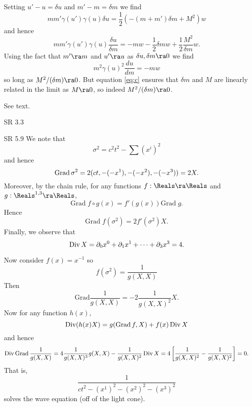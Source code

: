 \documentclass[minion]{homework}
\DeclareMathOperator{\Grad}{\rm Grad}
\DeclareMathOperator{\Div}{\rm Div}
\begin{document}
\begin{aproblems}
\subsol
Setting $u'-u=\delta u$ and $m'-m=\delta m$ we find
\begin{equation}
mm'\gamma(u')\gamma(u) \delta u = \frac{1}{2}( -(m+m')\delta m +M^2)w
\end{equation}
and hence
\begin{equation}
mm'\gamma(u')\gamma(u) \frac{\delta u}{\delta m} = -mw-\frac{1}{2}\delta mw + \frac{1}{2}\frac{M^2}{\delta m}w.
\end{equation}
Using the fact that $m'\ra m$ and $u'\ra u$ as $\delta u,\delta m\ra 0$ we find
\begin{equation}
m^2\gamma(u)^2 \frac{d u}{d m} =- mw
\end{equation}
so long as $M^2/(\delta m)\ra 0$.  But equation \eqref{eq:c} ensures that $\delta m$
and $M$ are linearly related in the limit as $M\ra 0$, so indeed $M^2/(\delta m)\ra 0$.

\subsol
See text.


\hproblem SR 3.3

\hproblem SR 5.9
We note that
\[
\sigma^2 = c^2t^2 - \sum (x^i)^2
\]
and hence
\[
\Grad \sigma^2 = 2(ct,-(-x^1),-(-x^2),-(-x^3)) = 2X.
\]
Moreover, by the chain rule, for any functions $f:\Reals\ra\Reals$ and 
$g:\Reals^{1,3}\ra\Reals$,
\[
\mathrm{Grad}\; f\circ g(x) = f'(g(x))\mathrm{Grad}\; g.
\]
Hence
\[
\mathrm{Grad}\; f(\sigma^2) = 2f'(\sigma^2) X.
\]
Finally, we observe that
\[
\Div X = \partial_0 x^0 + \partial_1 x^1 + \cdots + \partial_3 x^3 = 4.
\]

Now consider $f(x)=x^{-1}$ so 
\[
f(\sigma^2) = \frac{1}{g(X,X)}
\]
Then 
\[
\mathrm{Grad} \frac{1}{g(X,X)} = -2\frac{1}{g(X,X)^2}X.
\]
Now for any function $h(x)$,
\[
\Div (h(x) X) = g(\Grad f,X) + f(x) \Div X
\]
and hence
\[
\Div \Grad \frac{1}{g(X,X)} = 4\frac{1}{g(X,X)^3}g(X,X) - \frac{1}{g(X,X)^2} \Div X =  4\left[\frac{1}{g(X,X)^2}-\frac{1}{g(X,X)^2}\right]=0.
\]
That is,
\[
\frac{1}{ct^2-(x^1)^2-(x^2)^2-(x^3)^2}
\]
solves the wave equation (off of the light cone).



\end{aproblems}
\end{document}
